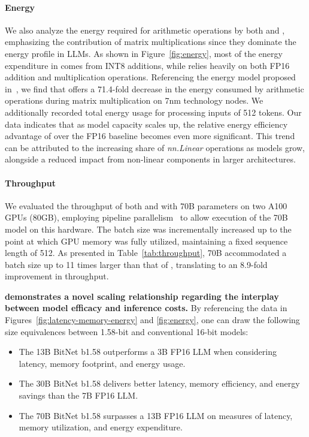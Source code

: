 \paragraph{Energy}

We also analyze the energy required for arithmetic operations by both  and , emphasizing the contribution of matrix multiplications since they dominate the energy profile in LLMs. As shown in Figure~\ref{fig:energy}, most of the energy expenditure in  comes from INT8 additions, while  relies heavily on both FP16 addition and multiplication operations. Referencing the energy model proposed in~\cite{energycost, pokebnn}, we find that  offers a 71.4-fold decrease in the energy consumed by arithmetic operations during matrix multiplication on 7nm technology nodes. We additionally recorded total energy usage for processing inputs of 512 tokens. Our data indicates that as model capacity scales up, the relative energy efficiency advantage of  over the FP16  baseline becomes even more significant. This trend can be attributed to the increasing share of \emph{nn.Linear} operations as models grow, alongside a reduced impact from non-linear components in larger architectures.

\paragraph{Throughput}

We evaluated the throughput of both  and  with 70B parameters on two A100 GPUs (80GB), employing pipeline parallelism~\cite{gpipe} to allow execution of the  70B model on this hardware. The batch size was incrementally increased up to the point at which GPU memory was fully utilized, maintaining a fixed sequence length of 512. As presented in Table~\ref{tab:throughput},  70B accommodated a batch size up to 11 times larger than that of , translating to an 8.9-fold improvement in throughput.

\textbf{ demonstrates a novel scaling relationship regarding the interplay between model efficacy and inference costs.} By referencing the data in Figures~\ref{fig:latency-memory-energy} and \ref{fig:energy}, one can draw the following size equivalences between 1.58-bit and conventional 16-bit models:

\begin{itemize}
    \item The 13B BitNet b1.58 outperforms a 3B FP16 LLM when considering latency, memory footprint, and energy usage.
    \item The 30B BitNet b1.58 delivers better latency, memory efficiency, and energy savings than the 7B FP16 LLM.
    \item The 70B BitNet b1.58 surpasses a 13B FP16 LLM on measures of latency, memory utilization, and energy expenditure.
\end{itemize}

